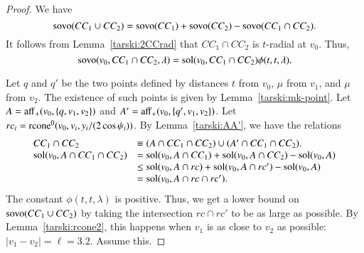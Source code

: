 
\begin{proof}
%
We have
 $$
 {\operatorname{sovo}}(CC_1\cup CC_2)=
 {\operatorname{sovo}}(CC_1)+{\operatorname{sovo}}(CC_2)-{\operatorname{sovo}}(CC_1\cap CC_2).
 $$
It follows from Lemma~\ref{tarski:2CCrad} that
$CC_1\cap CC_2$ is $t$-radial at $v_0$.  Thus,
$${\operatorname{sovo}}(v_0,CC_1\cap CC_2,\lambda) =
  \operatorname{sol}(v_0,CC_1\cap CC_2)\phi(t,t,\lambda).$$

Let $q$ and $q'$ be the two points defined by distances
$t$ from $v_0$, $\mu$ from $v_1$, and $\mu$ from $v_2$.
The existence of such points is given by Lemma~\ref{tarski:mk-point}.
Let $A={\operatorname{aff}}_+(v_0,\{q,v_1,v_2\})$ and
$A'={\operatorname{aff}}_+(v_0,\{q',v_1,v_2\})$.
Let $rc_i = {\operatorname{rcone}}^0(v_0,v_i,y_i/(2\cos\psi_i))$.
By Lemma~\ref{tarski:AA'}, we have the relations
$$
\begin{array}{lll}
CC_1\cap CC_2 &\equiv (A\cap CC_1\cap CC_2) \cup (A'\cap CC_1\cap CC_2).\\
\operatorname{sol}(v_0,A\cap CC_1\cap CC_2) &= \operatorname{sol}(v_0,A\cap CC_1) + \operatorname{sol}(v_0,A\cap CC_2)
  -\operatorname{sol}(v_0,A)\\
    &\le \operatorname{sol}(v_0,A\cap rc) + \operatorname{sol}(v_0,A\cap rc') - \operatorname{sol}(v_0,A)\\
    &= \operatorname{sol}(v_0, A \cap rc \cap rc').
\end{array}
$$
The constant $\phi(t,t,\lambda)$ is positive.  Thus, we
get a lower bound on ${\operatorname{sovo}}(CC_1\cup CC_2)$ by taking 
the intersection $rc \cap rc'$ to be as large as possible.
By Lemma~\ref{tarski:rcone2}, 
this happens when $v_1$ is as close to $v_2$ as possible:
$|v_1-v_2|=\ell=3.2$.  Assume this.


\end{proof}
